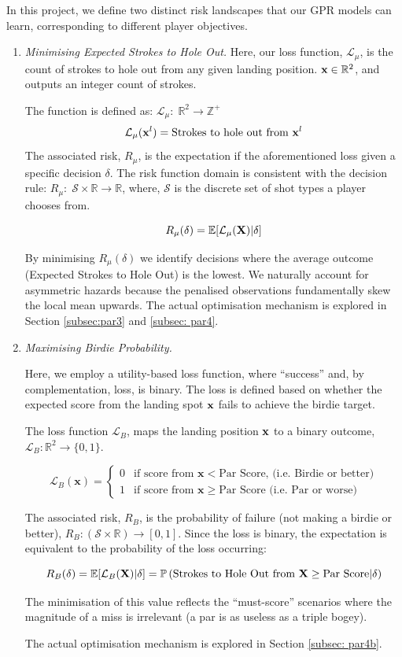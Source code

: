 \documentclass[11pt, letterpaper]{article}
\begin{document}
In this project, we define two distinct risk landscapes that our GPR models can learn, corresponding to different player objectives.
\begin{enumerate}
    \item \textit{Minimising Expected Strokes to Hole Out.} Here, our loss function, $\mathcal{L}_\mu$,  is the count of strokes to hole out from any given landing position. $ \mathbf{x} \in \mathbb{R}^2$, and outputs an integer count of strokes.

    The function is defined as: $\mathcal{L}_{\mu}:\; \mathbb{R}^2 \to \mathbb{Z^+}$
    $$\mathcal{L}_\mu(\mathbf{x}^l)= \text{Strokes to hole out from }\mathbf{x}^l$$
    The associated risk, $R_{\mu}$, is the expectation if the aforementioned loss given a specific decision $\delta$. The risk function domain is consistent with the decision rule:  $R_{\mu}:\; \mathcal{S} \times \mathbb{R}\to \mathbb{R}$, where, $\mathcal{S}$ is the discrete set of shot types a player chooses from.

    $$R_{\mu}(\delta) = \mathbb{E}[\mathcal{L}_\mu(\mathbf{X}) | \delta]$$
    
    By minimising $R_{\mu} (\delta)$ we identify decisions where the average outcome (Expected Strokes to Hole Out) is the lowest. We naturally account for asymmetric hazards because the penalised observations fundamentally skew the local mean upwards. The actual optimisation mechanism is explored in Section \ref{subsec:par3} and \ref{subsec: par4}.

    \item \textit{Maximising Birdie Probability.} 
    
    Here, we employ a utility-based loss function, where ``success'' and, by complementation, loss, is binary. The loss is defined based on whether the expected score from the landing spot $\mathbf{x}$ fails to achieve the birdie target. 

    The loss function $\mathcal{L}_B$, maps the landing position $\mathbf{x}$ to a binary outcome, $\mathcal{L}_B: \mathbb{R}^2 \to \{0,1\}$.

    $$\mathcal{L}_B(\mathbf{x}) = \begin{cases} 0 & \text{if } \text{score from } \mathbf{x} < \text{Par Score, (i.e. Birdie or better)} \\ 1 & \text{if } \text{score from } \mathbf{x} \ge \text{Par Score (i.e. Par or worse)} \end{cases}$$

    The associated risk, $R_B$, is the probability of failure (not making a birdie or better), $R_B: (\mathcal{S} \times \mathbb{R}) \to [0,1]$. Since the loss is binary, the expectation is equivalent to the probability of the loss occurring: 
    
    $$R_B(\delta) = \mathbb{E}[\mathcal{L}_B(\mathbf{X})|\delta] = \mathbb{P}\left(\text{Strokes to Hole Out from } \mathbf{X} \geq \text{Par Score} | \delta \right)$$
    
    The minimisation of this value reflects the ``must-score'' scenarios where the magnitude of a miss is irrelevant (a par is as useless as a triple bogey). 

     The actual optimisation mechanism is explored in Section \ref{subsec: par4b}.
\end{enumerate}
\end{document}
